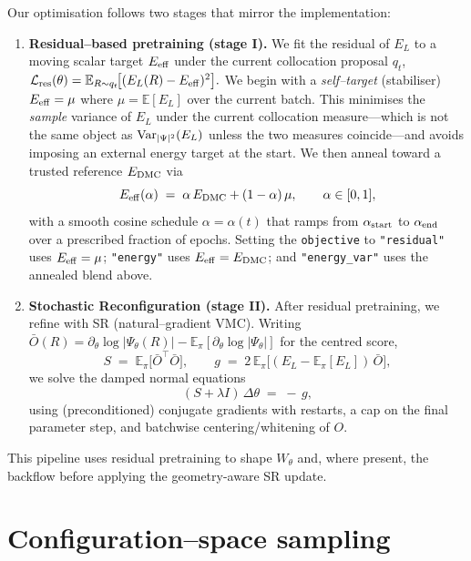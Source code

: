 Our optimisation follows two stages that mirror the implementation:
\begin{enumerate}
  \item \textbf{Residual–based pretraining (stage I).} We fit the residual of $E_L$ to a moving scalar target $E_{\rm eff}$ under the current collocation proposal $q_t$,
  \(
    \mathcal{L}_{\rm res}(\theta)=\mathbb{E}_{R\sim q_t}\!\big[(E_L(R)-E_{\rm eff})^2\big].
  \)
  We begin with a \emph{self–target} (stabiliser) $E_{\rm eff}=\mu$ where $\mu=\mathbb{E}[E_L]$ over the current batch. This minimises the \emph{sample} variance of $E_L$ under the current collocation measure---which is not the same object as $\mathrm{Var}_{|\Psi|^2}(E_L)$ unless the two measures coincide---and avoids imposing an external energy target at the start. We then anneal toward a trusted reference $E_{\rm DMC}$ via
  \begin{equation}
    E_{\rm eff}(\alpha) \;=\; \alpha\,E_{\rm DMC} + (1-\alpha)\,\mu,
    \qquad \alpha \in [0,1],
  \end{equation}
  with a smooth cosine schedule $\alpha=\alpha(t)$ that ramps from $\alpha_{\rm start}$ to $\alpha_{\rm end}$ over a prescribed fraction of epochs. Setting the \texttt{objective} to \texttt{"residual"} uses $E_{\rm eff}=\mu$; \texttt{"energy"} uses $E_{\rm eff}=E_{\rm DMC}$; and \texttt{"energy\_var"} uses the annealed blend above.
  \item \textbf{Stochastic Reconfiguration (stage II).} After residual pretraining, we refine with SR (natural–gradient VMC). Writing $\bar O(R)=\partial_\theta \log|\Psi_\theta(R)|-\mathbb{E}_\pi[\partial_\theta\log|\Psi_\theta|]$ for the centred score,
  \begin{equation}
    S \;=\; \mathbb{E}_\pi\!\big[\bar O^\top \bar O\big],\qquad
    g \;=\; 2\,\mathbb{E}_\pi\!\big[(E_L-\mathbb{E}_\pi[E_L])\,\bar O\big],
  \end{equation}
  we solve the damped normal equations
  \begin{equation}
    (S+\lambda I)\,\Delta\theta \;=\; -\,g,
  \end{equation}
  using (preconditioned) conjugate gradients with restarts, a cap on the final parameter step, and batchwise centering/whitening of $O$.
\end{enumerate}
This pipeline uses residual pretraining to shape $W_\theta$ and, where present, the backflow
before applying the geometry-aware SR update.

\section{Configuration–space sampling}
\label{sec:sampling}

